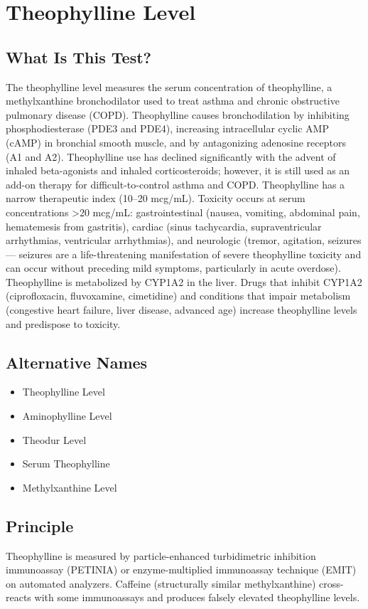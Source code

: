 \chapter{Theophylline Level}
\section*{What Is This Test?}
The theophylline level measures the serum concentration of theophylline, a methylxanthine bronchodilator used to treat asthma and chronic obstructive pulmonary disease (COPD). Theophylline causes bronchodilation by inhibiting phosphodiesterase (PDE3 and PDE4), increasing intracellular cyclic AMP (cAMP) in bronchial smooth muscle, and by antagonizing adenosine receptors (A1 and A2). Theophylline use has declined significantly with the advent of inhaled beta-agonists and inhaled corticosteroids; however, it is still used as an add-on therapy for difficult-to-control asthma and COPD. Theophylline has a narrow therapeutic index (10--20 mcg/mL). Toxicity occurs at serum concentrations >20 mcg/mL: gastrointestinal (nausea, vomiting, abdominal pain, hematemesis from gastritis), cardiac (sinus tachycardia, supraventricular arrhythmias, ventricular arrhythmias), and neurologic (tremor, agitation, seizures --- seizures are a life-threatening manifestation of severe theophylline toxicity and can occur without preceding mild symptoms, particularly in acute overdose). Theophylline is metabolized by CYP1A2 in the liver. Drugs that inhibit CYP1A2 (ciprofloxacin, fluvoxamine, cimetidine) and conditions that impair metabolism (congestive heart failure, liver disease, advanced age) increase theophylline levels and predispose to toxicity.
\section*{Alternative Names}
\begin{itemize}
  \item Theophylline Level
  \item Aminophylline Level
  \item Theodur Level
  \item Serum Theophylline
  \item Methylxanthine Level
\end{itemize}
\section*{Principle}
Theophylline is measured by particle-enhanced turbidimetric inhibition immunoassay (PETINIA) or enzyme-multiplied immunoassay technique (EMIT) on automated analyzers. Caffeine (structurally similar methylxanthine) cross-reacts with some immunoassays and produces falsely elevated theophylline levels.
